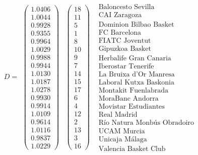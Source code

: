 	
	\[D=
	\begin{array}{ccc}
	\left(\begin{array}{c}
	1.0406\\
	1.0044\\
	0.9928\\
	0.9355\\
	0.9964\\
	1.0029\\
	0.9988\\
	0.9944\\
	1.0130\\
	1.0187\\
	1.0278\\
	0.9930\\
	0.9914\\
	1.0109\\
	0.9614\\
	1.0116\\
	0.9837\\
	1.0229
	\end{array} \right) & \left(\begin{array}{c}
	18\\
	11\\
	5\\
	1\\
	8\\
	10\\
	9\\
	7\\
	14\\
	15\\
	17\\
	6\\
	4\\
	12\\
	2\\
	13\\
	3\\
	16
	\end{array} \right) & \begin{array}{c}
	\text{Baloncesto Sevilla}\\
	\text{CAI Zaragoza} \\
	\text{Dominion Bilbao Basket} \\
	\text{FC Barcelona} \\
	\text{FIATC Joventut} \\
	\text{Gipuzkoa Basket} \\
	\text{Herbalife Gran Canaria} \\
	\text{Iberostar Tenerife} \\
	\text{La Bruixa d'Or Manresa} \\
	\text{Laboral Kutxa Baskonia} \\
	\text{Montakit Fuenlabrada} \\
	\text{MoraBanc Andorra} \\
	\text{Movistar Estudiantes} \\
	\text{Real Madrid} \\
	\text{Río Natura Monbús Obradoiro} \\
	\text{UCAM Murcia} \\
	\text{Unicaja Málaga} \\
	\text{Valencia Basket Club}
	\end{array}
	\end{array}
	\]
	

